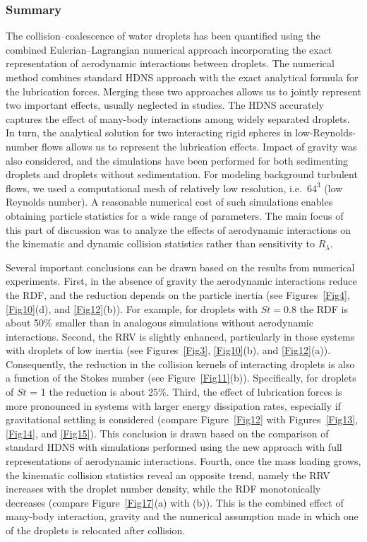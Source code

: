 \documentclass[../thesis.tex]{subfiles}
\begin{document}
\subsubsection{Summary}

The collision--coalescence of water droplets has been quantified using the combined Eulerian--Lagrangian numerical approach incorporating the exact representation of aerodynamic interactions between droplets. The numerical method combines standard HDNS approach with the exact analytical formula for the lubrication forces. Merging these two approaches allows us to jointly represent two important effects, usually neglected in studies. The HDNS accurately captures the effect of many-body interactions among widely separated droplets. In turn, the analytical solution for two interacting rigid spheres in low-Reynolds-number flows allows us to represent the lubrication effects. Impact of gravity was also considered, and the simulations have been performed for both sedimenting droplets and droplets without sedimentation. For modeling background turbulent flows, we used a computational mesh of relatively low resolution, i.e.\ $64^3$ (low Reynolds number). A reasonable numerical cost of such simulations enables obtaining particle statistics for a wide range of parameters. The main focus of this part of discussion was to analyze the effects of aerodynamic interactions on the kinematic and dynamic collision statistics rather than sensitivity to $R_{\lambda}$.

Several important conclusions can be drawn based on the results from numerical experiments. First, in the absence of gravity the aerodynamic interactions reduce the RDF, and the reduction depends on the particle inertia (see Figures~\ref{Fig4}, \ref{Fig10}(d), and \ref{Fig12}(b)). For example, for droplets with $St=0.8$ the RDF is about 50\% smaller than in analogous simulations without aerodynamic interactions. Second, the RRV is slightly enhanced, particularly in those systems with droplets of low inertia (see Figures~\ref{Fig3}, \ref{Fig10}(b), and \ref{Fig12}(a)). Consequently, the reduction in the collision kernels of interacting droplets is also a function of the Stokes number (see Figure~\ref{Fig11}(b)). Specifically, for droplets of $St$ = 1 the reduction is about 25\%. Third, the effect of lubrication forces is more pronounced in systems with larger energy dissipation rates, especially if gravitational settling is considered (compare Figure~\ref{Fig12} with Figures~\ref{Fig13}, \ref{Fig14}, and \ref{Fig15}). This conclusion is drawn based on the comparison of standard HDNS with simulations performed using the new approach with full representations of aerodynamic interactions. Fourth, once the mass loading grows, the kinematic collision statistics reveal an opposite trend, namely the RRV increases with the droplet number density, while the RDF monotonically decreases (compare Figure~\ref{Fig17}(a) with (b)). This is the combined effect of many-body interaction, gravity and the numerical assumption made in which one of the droplets is relocated after collision.  

%
%
\newpage
\end{document}
